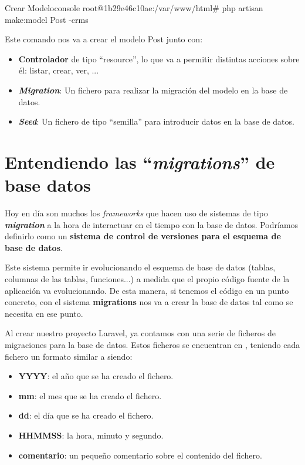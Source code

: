 \begin{mycode}{Crear Modelo}{console}{}
root@1b29e46c10ae:/var/www/html# php artisan make:model Post -crms
\end{mycode}

Este comando nos va a crear el modelo Post junto con:
\begin{itemize}
    \item \textbf{Controlador} de tipo “resource”, lo que va a permitir distintas acciones sobre él: listar, crear, ver, ...
    \item \textbf{\textit{Migration}}: Un fichero para realizar la migración del modelo en la base de datos.
    \item \textbf{\textit{Seed}}: Un fichero de tipo “semilla” para introducir datos en la base de datos.
\end{itemize}


\chapter{Entendiendo las “\textit{migrations}” de base datos}

Hoy en día son muchos los \textit{frameworks} que hacen uso de sistemas de tipo \textbf{\textit{migration}} a la hora de interactuar en el tiempo con la base de datos. Podríamos definirlo como un \textbf{sistema de control de versiones para el esquema de base de datos}.

Este sistema permite ir evolucionando el esquema de base de datos (tablas, columnas de las tablas, funciones...) a medida que el propio código fuente de la aplicación va evolucionando. De esta manera, si tenemos el código en un punto concreto, con el sistema \textbf{migrations} nos va a crear la base de datos tal como se necesita en ese punto.

Al crear nuestro proyecto Laravel, ya contamos con una serie de ficheros de migraciones para la base de datos. Estos ficheros se encuentran en , teniendo cada fichero un formato similar a  siendo:

\begin{itemize}
    \item \textbf{YYYY}: el año que se ha creado el fichero.
    \item \textbf{mm}: el mes que se ha creado el fichero.
    \item \textbf{dd}: el día que se ha creado el fichero.
    \item \textbf{HHMMSS}: la hora, minuto y segundo.
    \item \textbf{comentario}: un pequeño comentario sobre el contenido del fichero.
\end{itemize}

